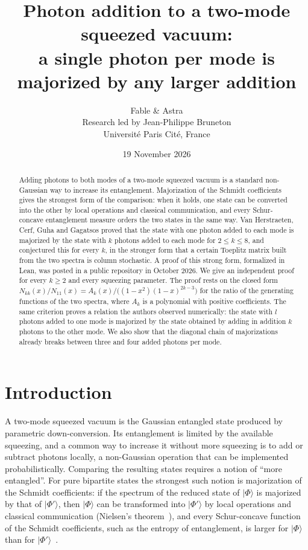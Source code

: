 \documentclass[11pt,a4paper]{article}
\title{Photon addition to a two-mode squeezed vacuum:\\
a single photon per mode is majorized by any larger addition}
\author{Fable \& Astra\\[0.35em]
\normalsize Research led by Jean-Philippe Bruneton\\[-0.1em]
\small Universit\'e Paris Cit\'e, France}
\date{19 November 2026}
\theoremstyle{definition}
\theoremstyle{plain}
\newcommand{\ket}[1]{\lvert#1\rangle}
\begin{document}
\maketitle
\begin{abstract}
Adding photons to both modes of a two-mode squeezed vacuum is a standard
non-Gaussian way to increase its entanglement. Majorization of the Schmidt
coefficients gives the strongest form of the comparison: when it holds, one
state can be converted into the other by local operations and classical
communication, and every Schur-concave entanglement measure orders the two
states in the same way. Van Herstraeten, Cerf, Guha and Gagatsos proved that the
state with one photon added to each mode is majorized by the state with $k$
photons added to each mode for $2\le k\le 8$, and conjectured this for every
$k$, in the stronger form that a certain Toeplitz matrix built from the two
spectra is column stochastic. A proof of this strong form, formalized in Lean,
was posted in a public repository in October 2026. We give an independent
proof for every $k\ge 2$ and every squeezing parameter. The proof rests on the closed
form $N_{kk}(x)/N_{11}(x)=A_k(x)/\bigl((1-x^2)(1-x)^{2k-3}\bigr)$ for the ratio
of the generating functions of the two spectra, where $A_k$ is a polynomial
with positive coefficients. The same criterion proves a relation the authors
observed numerically: the state with $l$ photons added to one mode is
majorized by the state obtained by adding in addition $k$ photons to the other
mode. We also show that the diagonal chain of majorizations already breaks
between three and four added photons per mode.
\end{abstract}

\section{Introduction}
A two-mode squeezed vacuum is the Gaussian entangled state produced by
parametric down-conversion. Its entanglement is limited by the available
squeezing, and a common way to increase it without more squeezing is to add or
subtract photons locally, a non-Gaussian operation that can be implemented
probabilistically. Comparing the resulting states requires a notion of
``more entangled''. For pure bipartite states the strongest such notion is
majorization of the Schmidt coefficients: if the spectrum of the reduced state
of $\ket\Phi$ is majorized by that of $\ket{\Phi'}$, then $\ket\Phi$ can be
transformed into $\ket{\Phi'}$ by local operations and classical communication
(Nielsen's theorem~\cite{Nielsen1999}), and every Schur-concave function of
the Schmidt coefficients, such as the entropy of entanglement, is larger for
$\ket\Phi$ than for $\ket{\Phi'}$~\cite{MarshallOlkin2011}.
\end{document}
